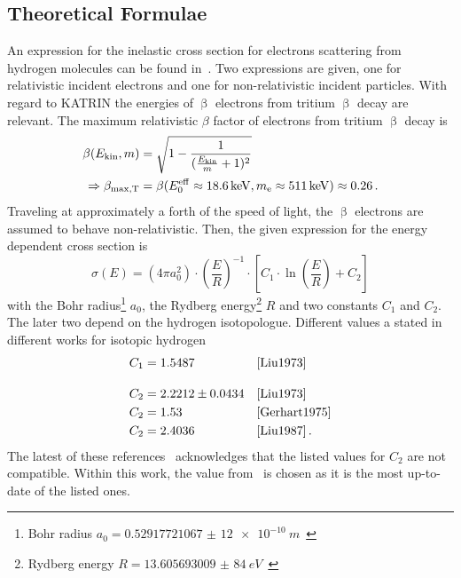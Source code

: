 \subsection{Theoretical Formulae}
\label{sec:eDepScatCrossSecSourcesTheory}
An expression for the inelastic cross section for electrons scattering from hydrogen molecules can be found in~\cite{Liu1973}. Two expressions are given, one for relativistic incident electrons and one for non-relativistic incident particles. With regard to KATRIN the energies of $\upbeta$ electrons from tritium $\upbeta$ decay are relevant. The maximum relativistic $\beta$ factor of electrons from tritium $\upbeta$ decay is
\begin{align}
\beta(E_\mathrm{kin}, m) &= 
\sqrt{
	1-\frac{1}{
		(\frac{E_\mathrm{kin}}{m}+1)^2
	}
} \label{eq:eDepScatCrossSecSourcesCrossSecBetaFactor} \\
\Rightarrow\beta_\mathrm{max, T} &= 
\beta(E_0^\mathrm{eff}\approx\SI{18.6}{keV}, m_{\mathrm{e}}\approx\SI{511}{keV})\approx0.26 
\text{\,.}
\end{align}
Traveling at approximately a forth of the speed of light, the $\upbeta$ electrons are assumed to behave non-relativistic. Then, the given expression for the energy dependent cross section is~\cite{Liu1973}
\begin{equation}
\label{eq:eDepScatCrossSecSourcesCrossSecLiu}
\sigma(E) =  
(4 \pi a_0^2) \cdot
\left(\frac{E}{R}\right)^{-1} \cdot
\left[
C_1 \cdot \ln{\left(\frac{E}{R}\right)} + C_2
\right]
\end{equation}
with the Bohr radius\footnote{Bohr radius $a_0=\SI[separate-uncertainty=false]{0.529 177 210 67(12)e-10}{m}$~\cite{ReviewOfParticlePhysics}} $a_0$, 
the Rydberg energy\footnote{Rydberg energy $R=\SI[separate-uncertainty=false]{13.605 693 009(84)}{eV}$~\cite{ReviewOfParticlePhysics}} $R$ and two constants $C_1$ and $C_2$. The later two depend on the hydrogen isotopologue. Different values a stated in different works for isotopic hydrogen
\begin{subequations}
\label{eq:eDepScatCrossSecSourcesCrossSecLiuConstants}
\begin{align}
C_1 &= 1.5487 &&\text{\cite{Liu1973}}
\label{eq:eDepScatCrossSecSourcesCrossSecLiuConstantsC1}\\[10pt]
C_2 &= 2.2212\pm0.0434 &&\text{\cite{Liu1973}}
\label{eq:eDepScatCrossSecSourcesCrossSecLiuConstantsC2Uncert}\\
C_2 &= 1.53 &&\text{\cite{Gerhart1975}} \\
C_2 &= 2.4036 &&\text{\cite{Liu1987}}
\label{eq:eDepScatCrossSecSourcesCrossSecLiuConstantsC2}
\text{\,.}
\end{align}
\end{subequations}
The latest of these references~\cite{Liu1987} acknowledges that the listed values for $C_2$ are not compatible. Within this work, the value from~\cite{Liu1987} is chosen as it is the most up-to-date of the listed ones. 

